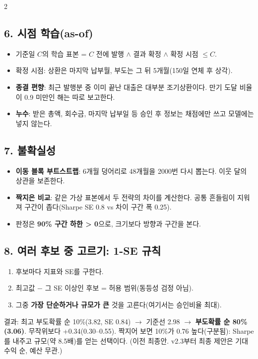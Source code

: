\documentclass[10pt]{report}
\begin{document}
\begin{multicols}{2}
\subsection*{6. 시점 학습(as-of)}
\begin{itemize}
\item 기준일 $C$의 학습 표본 = $C$ 전에 발행 $\wedge$ 결과 확정 $\wedge$ 확정 시점 $\le C$.
\item 확정 시점: 상환은 마지막 납부월, 부도는 그 뒤 5개월(150일 연체 후 상각).
\item \textbf{종결 편향}: 최근 발행분 중 이미 끝난 대출은 대부분 조기상환이다. 만기 도달 비율이 0.9 미만인 해는 따로 보고한다.
\item \textbf{누수}: 받은 총액, 회수금, 마지막 납부일 등 승인 후 정보는 채점에만 쓰고 모델에는 넣지 않는다.
\end{itemize}

\subsection*{7. 불확실성}
\begin{itemize}
\item \textbf{이동 블록 부트스트랩}: 6개월 덩어리로 48개월을 2000번 다시 뽑는다. 이웃 달의 상관을 보존한다.
\item \textbf{짝지은 비교}: 같은 가상 표본에서 두 전략의 차이를 계산한다. 공통 흔들림이 지워져 구간이 좁다(Sharpe SE 0.8 vs 차이 구간 폭 0.25).
\item 판정은 \textbf{90\% 구간 하한 > 0}으로, 크기보다 방향과 구간을 본다.
\end{itemize}

\subsection*{8. 여러 후보 중 고르기: 1-SE 규칙}
\begin{enumerate}
\item 후보마다 지표와 SE를 구한다.
\item 최고값 $-$ 그 SE 이상인 후보 = 허용 범위(동등성 검정 아님).
\item 그중 \textbf{가장 단순하거나 규모가 큰} 것을 고른다(여기서는 승인비율 최대).
\end{enumerate}
결과: 최고 부도확률 순 10\%(3.82, SE 0.84) \ensuremath{\to} 기준선 2.98 \ensuremath{\to} \textbf{부도확률 순 80\%(3.06)}. 무작위보다 +0.34(0.30--0.55). 짝지어 보면 10\%가 0.76 높다(구분됨): Sharpe를 내주고 규모(약 8.5배)를 얻는 선택이다. (이전 최종안. v2.3부터 최종 제안은 기대수익 순, 예산 무관.)


\end{multicols}
\end{document}
